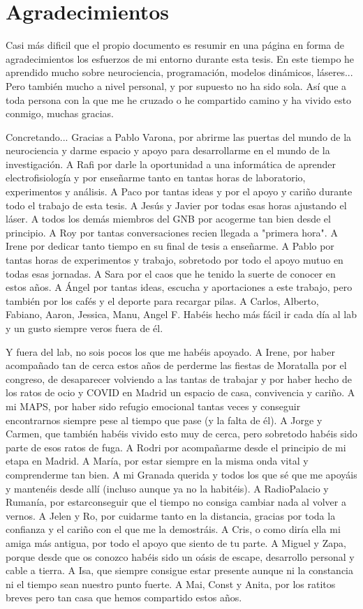 \chapter*{Agradecimientos}
Casi más dificil que el propio documento es resumir en una página en forma de agradecimientos los esfuerzos de mi entorno durante esta tesis. En este tiempo he aprendido mucho sobre neurociencia, programación, modelos dinámicos, láseres... Pero también mucho a nivel personal, y por supuesto no ha sido sola. Así que a toda persona con la que me he cruzado o he compartido camino y ha vivido esto conmigo, muchas gracias. 

Concretando... Gracias a Pablo Varona, por abrirme las puertas del mundo de la neurociencia y darme espacio y apoyo para desarrollarme en el mundo de la investigación. A Rafi por darle la oportunidad a una informática de aprender electrofisiología y por enseñarme tanto en tantas horas de laboratorio, experimentos y análisis. A Paco por tantas ideas y por el apoyo y cariño durante todo el trabajo de esta tesis. A Jesús y Javier por todas esas horas ajustando el láser. A todos los demás miembros del GNB por acogerme tan bien desde el principio. A Roy por tantas conversaciones recien llegada a "primera hora". A Irene por dedicar tanto tiempo en su final de tesis a enseñarme. A Pablo por tantas horas de experimentos y trabajo, sobretodo por todo el apoyo mutuo en todas esas jornadas. A Sara por el caos que he tenido la suerte de conocer en estos años. A Ángel por tantas ideas, escucha y aportaciones a este trabajo, pero también por los cafés y el deporte para recargar pilas. A Carlos, Alberto, Fabiano, Aaron, Jessica, Manu, Angel F. Habéis hecho más fácil ir cada día al lab y un gusto siempre veros fuera de él. 


Y fuera del lab, no sois pocos los que me habéis apoyado. A Irene, por haber acompañado tan de cerca estos años de perderme las fiestas de Moratalla por el congreso, de desaparecer volviendo a las tantas de trabajar y por haber hecho de los ratos de ocio y COVID en Madrid un espacio de casa, convivencia y cariño. A mi MAPS, por haber sido refugio emocional tantas veces y conseguir encontrarnos siempre pese al tiempo que pase (y la falta de él). A Jorge y Carmen, que también habéis vivido esto muy de cerca, pero sobretodo habéis sido parte de esos ratos de fuga. A Rodri por acompañarme desde el principio de mi etapa en Madrid. A María, por estar siempre en la misma onda vital y comprenderme tan bien. A mi Granada querida y todos los que sé que me apoyáis y mantenéis desde allí (incluso aunque ya no la habitéis). A RadioPalacio y Rumanía, por estarconseguir que el tiempo no consiga cambiar nada al volver a vernos. A Jelen y Ro, por cuidarme tanto en la distancia, gracias por toda la confianza y el cariño con el que me la demostráis. A Cris, o como diría ella mi amiga más antigua, por todo el apoyo que siento de tu parte. A Miguel y Zapa, porque desde que os conozco habéis sido un oásis de escape, desarrollo personal y cable a tierra. A Isa, que siempre consigue estar presente aunque ni la constancia ni el tiempo sean nuestro punto fuerte. A Mai, Const y Anita, por los ratitos breves pero tan casa que hemos compartido estos años.

